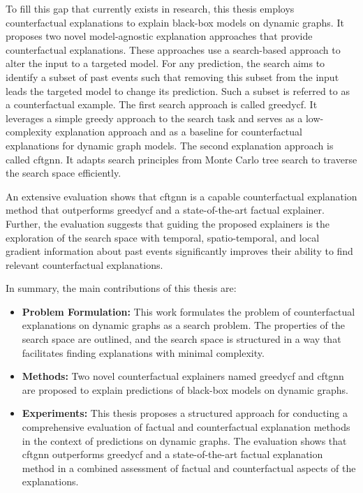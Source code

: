 To fill this gap that currently exists in research, this thesis employs counterfactual explanations to explain black-box models on dynamic graphs. It proposes two novel model-agnostic explanation approaches that provide counterfactual explanations. These approaches use a search-based approach to alter the input to a targeted model. For any prediction, the search aims to identify a subset of past events such that removing this subset from the input leads the targeted model to change its prediction. Such a subset is referred to as a counterfactual example. The first search approach is called \gls{greedycf}. It leverages a simple greedy approach to the search task and serves as a low-complexity explanation approach and as a baseline for counterfactual explanations for dynamic graph models. The second explanation approach is called \gls{cftgnn}. It adapts search principles from Monte Carlo tree search to traverse the search space efficiently. 

An extensive evaluation shows that \gls{cftgnn} is a capable counterfactual explanation method that outperforms \gls{greedycf} and a state-of-the-art factual explainer. Further, the evaluation suggests that guiding the proposed explainers is the exploration of the search space with temporal, spatio-temporal, and local gradient information about past events significantly improves their ability to find relevant counterfactual explanations.

In summary, the main contributions of this thesis are:

\begin{itemize}
    \item \textbf{Problem Formulation:} This work formulates the problem of counterfactual explanations on dynamic graphs as a search problem. The properties of the search space are outlined, and the search space is structured in a way that facilitates finding explanations with minimal complexity.

    \item \textbf{Methods:} Two novel counterfactual explainers named \gls{greedycf} and \gls{cftgnn} are proposed to explain predictions of black-box models on dynamic graphs.

    \item \textbf{Experiments:} This thesis proposes a structured approach for conducting a comprehensive evaluation of factual and counterfactual explanation methods in the context of predictions on dynamic graphs. The evaluation shows that \gls{cftgnn} outperforms \gls{greedycf} and a state-of-the-art factual explanation method in a combined assessment of factual and counterfactual aspects of the explanations.
    
\end{itemize}


